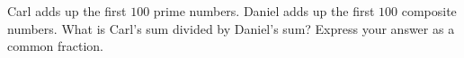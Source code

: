 Carl adds up the first $100$ prime numbers. Daniel adds up the first $100$ composite numbers. What is Carl's sum divided by Daniel's sum? Express your answer as a common fraction.

